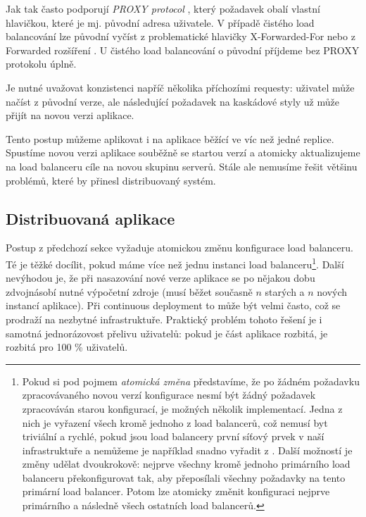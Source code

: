             Jak  tak   často podporují \textit{PROXY protocol} \cite{tarreau-proxyprotocol}, který požadavek obalí vlastní hlavičkou, které je mj. původní  adresa uživatele. V případě čistého  load balancování lze původní  vyčíst z problematické \cite{hansen-xforwardedfor} hlavičky X-Forwarded-For nebo z Forwarded rozšíření \cite{http-forwarded}. U čistého  load balancování o původní  příjdeme bez PROXY protokolu úplně.

            Je nutné uvažovat konzistenci napříč několika příchozími \HTTP requesty: uživatel může načíst \HTML z původní verze, ale následující \HTTP požadavek na kaskádové styly už může přijít na novou verzi aplikace.

            Tento postup můžeme aplikovat i na aplikace běžící ve víc než jedné replice. Spustíme novou verzi aplikace souběžně se startou verzí a atomicky aktualizujeme na load balanceru cíle na novou skupinu serverů. Stále ale nemusíme řešit většinu problémů, které by přinesl distribuovaný systém.

        \subsection{Distribuovaná aplikace}
            \label{distributed-apps}
            Postup z předchozí sekce vyžaduje atomickou změnu konfigurace load balanceru. Té je těžké docílit, pokud máme více než jednu instanci load balanceru\footnote{Pokud si pod pojmem \textit{atomická změna} představíme, že po žádném požadavku zpracovávaného novou verzí konfigurace nesmí být žádný požadavek zpracováván starou konfigurací, je možných několik implementací. Jedna z nich je vyřazení všech kromě jednoho z load balancerů, což nemusí byt triviální a rychlé, pokud jsou load balancery první síťový prvek v naší infrastruktuře a nemůžeme je například snadno vyřadit z . Další možností je změny udělat dvoukrokově: nejprve všechny kromě jednoho primárního load balanceru překonfigurovat tak, aby přeposílali všechny požadavky na tento primární load balancer. Potom lze atomicky změnit konfiguraci nejprve primárního a následně všech ostatních load balancerů.}. Další nevýhodou je, že při nasazování nové verze aplikace se po nějakou dobu zdvojnásobí nutné výpočetní zdroje (musí běžet současně $n$ starých a $n$ nových instancí aplikace). Při continuous deployment to může být velmi často, což se prodraží na nezbytné infrastruktuře. Praktický problém tohoto řešení je i samotná jednorázovost přelivu uživatelů: pokud je část aplikace rozbitá, je rozbitá pro 100 \% uživatelů.

